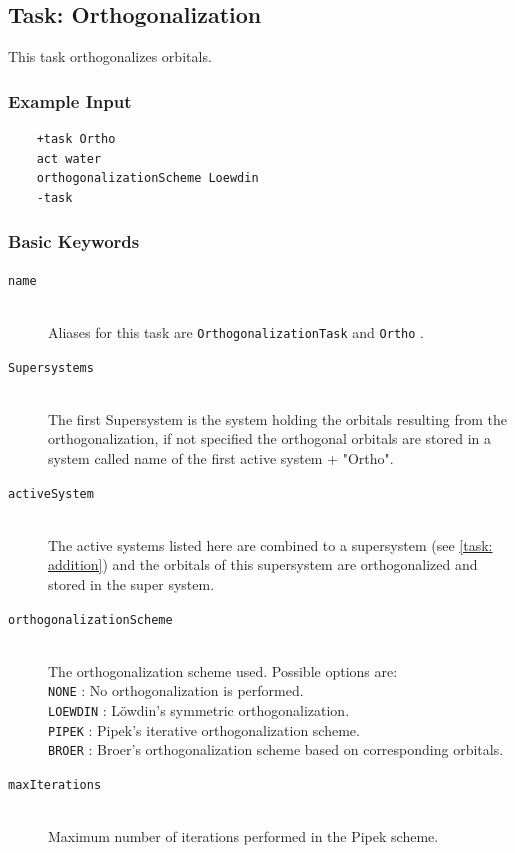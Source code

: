 \documentclass[bibliography=totocnumbered,a4paper,10pt,oneside]{scrbook}
\newcommand{\ttt}[1]{%
  \begingroup\setlength{\fboxsep}{1pt}%
  \colorbox{serenity-green!30}{\texttt{\hspace*{2pt}\vphantom{(g}#1\hspace*{2pt}}}%
  \endgroup
}
\begin{document}
\subsection{Task: Orthogonalization}\label{task: ortho}
This task orthogonalizes orbitals.
\subsubsection{Example Input}
\begin{lstlisting}
	+task Ortho
	act water
	orthogonalizationScheme Loewdin
	-task
\end{lstlisting}

\subsubsection{Basic Keywords}
\begin{description}
	\item [\texttt{name}]\hfill \\
	Aliases for this task are \ttt{OrthogonalizationTask} and \ttt{Ortho}.
	\item [\texttt{Supersystems}]\hfill \\
	The first Supersystem is the system holding the orbitals resulting from the orthogonalization, if not specified the orthogonal orbitals are stored in a system
	called name of the first active system + "Ortho".
	\item [\texttt{activeSystem}]\hfill \\
	The active systems listed here are combined to a supersystem (see \ref{task: addition}) and the orbitals
	of this supersystem are orthogonalized and stored in the super system.
	\item [\texttt{orthogonalizationScheme}]\hfill \\
	The orthogonalization scheme used. Possible options are:\\
	\ttt{NONE}: No orthogonalization is performed.\\
	\ttt{LOEWDIN}: L\"owdin's symmetric orthogonalization\cite{lowdin1950, lowdin1970}.\\
	\ttt{PIPEK}: Pipek's iterative orthogonalization scheme\cite{pipek1985}.\\
	\ttt{BROER}: Broer's orthogonalization scheme based on corresponding orbitals\cite{broer1993}.\\
	\item [\texttt{maxIterations}]\hfill \\
	Maximum number of iterations performed in the Pipek scheme.

\end{description}
\end{document}

